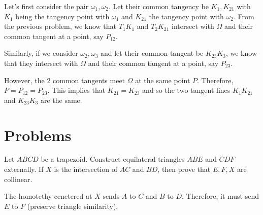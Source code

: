 \documentclass[11pt,twoside]{scrartcl}
\begin{document}
    Let's first consider the pair $\omega_1, \omega_2$. Let their common tangency be $K_1, K_{21}$ with $K_1$ being the tangency point with $\omega_1$ and $K_{21}$  the tangency point with $\omega_2$. From the previous problem, we know that $T_1K_1$ and $T_2K_{21}$ intersect with $\Omega$ and their common tangent at a point, say $P_{12}$.

    Similarly, if we consider $\omega_2, \omega_3$ and let their common tangent be $K_{23}K_3$, we know that they intersect with $\Omega$ and their common tangent at a point, say $P_{23}$.

    However, the 2 common tangents meet $\Omega$ at the same point $P$. Therefore, $P = P_{12} = P_{23}$. This implies that $K_{21} = K_{23}$ and so the two tangent lines $K_1K_{21}$ and $K_{23}K_3$ are the same.

\clearpage
\section{Problems}
\begin{problem}
    Let $ABCD$ be a trapezoid. Construct equilateral triangles $ABE$ and $CDF$ externally. If $X$ is the intersection of $AC$ and $BD$, then prove that $E, F, X$ are collinear.
    \begin{sketch}
        The homotethy cenetered at $X$ sends $A$ to $C$ and $B$ to $D$. Therefore, it must send $E$ to $F$ (preserve triangle similarity). 
    \end{sketch}
\end{problem}

\begin{problem}
    \TBD
    \begin{sketch}
        \TBD 
    \end{sketch}
\end{problem}

\begin{problem}
    \TBD
    \begin{sketch}
        \TBD 
    \end{sketch}
\end{problem}

\begin{problem}
    \TBD
    \begin{sketch}
        \TBD 
    \end{sketch}
\end{problem}

\begin{problem}
    \TBD
    \begin{sketch}
        \TBD 
    \end{sketch}
\end{problem}
\end{document}
